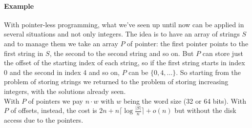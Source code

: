 \documentclass[10pt]{report}
\begin{document}
\paragraph{Example} With pointer-less programming, what we've seen up until now can be applied in several situations and not only integers. The idea is to have an array of strings $S$ and to manage them we take an array $P$ of pointer: the first pointer points to the first string in $S$, the second to the second string and so on. But $P$ can store just the offset of the starting index of each string, so if the first string starts in index 0 and the second in index 4 and so on, $P$ can be $\{0,4,\ldots\}$. So starting from the problem of storing strings we returned to the problem of storing increasing integers, with the solutions already seen.\\
With $P$ of pointers we pay $n\cdot w$ with $w$ being the word size (32 or 64 bits). With $P$ of offsets, instead, the cost is $2n+n\lceil\log\frac{|S|}{n}\rceil+o(n)$ but without the disk access due to the pointers.
\end{document}
